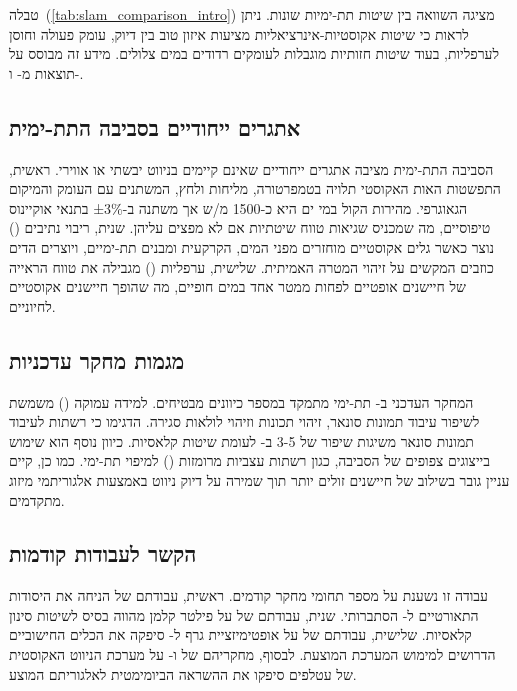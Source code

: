 טבלה~(\ref{tab:slam_comparison_intro}) מציגה השוואה בין שיטות  תת-ימיות שונות. ניתן לראות כי שיטות אקוסטיות-אינרציאליות מציעות איזון טוב בין דיוק, עומק פעולה וחוסן לערפליות, בעוד שיטות חזותיות מוגבלות לעומקים רדודים במים צלולים. מידע זה מבוסס על תוצאות מ-\cite{Rahman2022} ו-\cite{Chen2023}.

\subsection{אתגרים ייחודיים בסביבה התת-ימית}
\label{sec:underwater_challenges}

הסביבה התת-ימית מציבה אתגרים ייחודיים שאינם קיימים בניווט יבשתי או אווירי. ראשית, התפשטות האות האקוסטי תלויה בטמפרטורה, מליחות ולחץ, המשתנים עם העומק והמיקום הגאוגרפי. מהירות הקול במי ים היא כ-1500 מ\!/\!ש אך משתנה ב-±3\% בתנאי אוקיינוס טיפוסיים, מה שמכניס שגיאות טווח שיטתיות אם לא מפצים עליהן. שנית, ריבוי נתיבים () נוצר כאשר גלים אקוסטיים מוחזרים מפני המים, הקרקעית ומבנים תת-ימיים, ויוצרים הדים כוזבים המקשים על זיהוי המטרה האמיתית. שלישית, ערפליות () מגבילה את טווח הראייה של חיישנים אופטיים לפחות ממטר אחד במים חופיים, מה שהופך חיישנים אקוסטיים לחיוניים.

\subsection{מגמות מחקר עדכניות}
\label{sec:current_trends}

המחקר העדכני ב- תת-ימי מתמקד במספר כיוונים מבטיחים. למידה עמוקה () משמשת לשיפור עיבוד תמונות סונאר, זיהוי תכונות וזיהוי לולאות סגירה. \citet{Wang2023} הדגימו כי רשתות  לעיבוד תמונות סונאר משיגות שיפור של 3-5  ב- לעומת שיטות קלאסיות. כיוון נוסף הוא שימוש בייצוגים צפופים של הסביבה, כגון רשתות עצביות מרומזות () למיפוי תת-ימי. כמו כן, קיים עניין גובר בשילוב של חיישנים זולים יותר תוך שמירה על דיוק ניווט באמצעות אלגוריתמי מיזוג מתקדמים.

\subsection{הקשר לעבודות קודמות}
\label{sec:related_work}

עבודה זו נשענת על מספר תחומי מחקר קודמים. ראשית, עבודתם של \citet{Thrun2005ProbRobotics} הניחה את היסודות התאורטיים ל- הסתברותי. שנית, עבודתם של \citet{Kalman1960} על פילטר קלמן מהווה בסיס לשיטות סינון קלאסיות. שלישית, עבודתם של \citet{Grisetti2010g2o} על אופטימיזציית גרף ל- סיפקה את הכלים החישוביים הדרושים למימוש המערכת המוצעת. לבסוף, מחקריהם של \citet{GriffinBatEcholocation} ו-\citet{Simmons1979BatSonar} על מערכת הניווט האקוסטית של עטלפים סיפקו את ההשראה הביומימטית לאלגוריתם המוצע.

